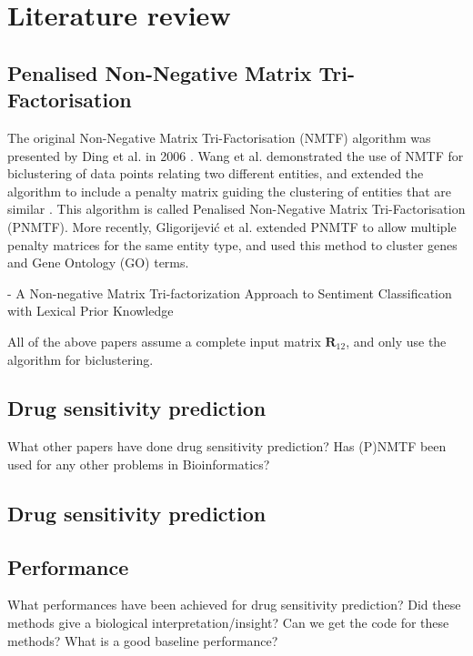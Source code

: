 \documentclass{article}
\begin{document}
	\section{Literature review}
		\subsection{Penalised Non-Negative Matrix Tri-Factorisation}
			The original Non-Negative Matrix Tri-Factorisation (NMTF) algorithm was presented by Ding et al. in 2006 \cite{ding_2006}. Wang et al. demonstrated the use of NMTF for biclustering of data points relating two different entities, and extended the algorithm to include a penalty matrix guiding the clustering of entities that are similar \cite{wang_2008}. This algorithm is called Penalised Non-Negative Matrix Tri-Factorisation (PNMTF). More recently, Gligorijevi\'{c} et al. \cite{gligorijevic_2014} extended PNMTF to allow multiple penalty matrices for the same entity type, and used this method to cluster genes and Gene Ontology (GO) terms.
			
			- A Non-negative Matrix Tri-factorization Approach to Sentiment Classification with Lexical Prior Knowledge
			
			
			
			All of the above papers assume a complete input matrix \( \boldsymbol R_{12} \), and only use the algorithm for biclustering.
	
		\subsection{Drug sensitivity prediction}
	
		What other papers have done drug sensitivity prediction?
		Has (P)NMTF been used for any other problems in Bioinformatics?
		
		\subsection{Drug sensitivity prediction}
		
		\subsection{Performance}
			What performances have been achieved for drug sensitivity prediction? 
			Did these methods give a biological interpretation/insight?
			Can we get the code for these methods?
			What is a good baseline performance?
		
		
\end{document}
